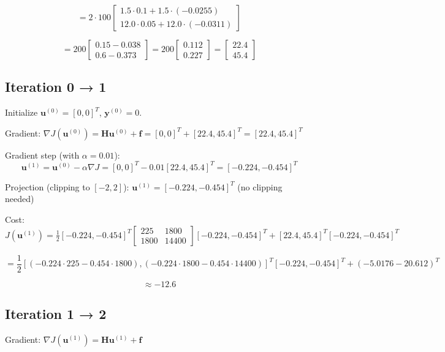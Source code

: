 \[
= 2 \cdot 100 \begin{bmatrix} 1.5 \cdot 0.1 + 1.5 \cdot (-0.0255) \\ 12.0 \cdot 0.05 + 12.0 \cdot (-0.0311) \end{bmatrix}
\]

\[
= 200 \begin{bmatrix} 0.15 - 0.038 \\ 0.6 - 0.373 \end{bmatrix} = 200 \begin{bmatrix} 0.112 \\ 0.227 \end{bmatrix} = \begin{bmatrix} 22.4 \\ 45.4 \end{bmatrix}
\]

\subsection{Iteration 0 → 1}

Initialize $\mathbf{u}^{(0)} = [0, 0]^T$, $\mathbf{y}^{(0)} = 0$.

Gradient: $\nabla J(\mathbf{u}^{(0)}) = \mathbf{H} \mathbf{u}^{(0)} + \mathbf{f} = [0, 0]^T + [22.4, 45.4]^T = [22.4, 45.4]^T$

Gradient step (with $\alpha = 0.01$):
\[
\mathbf{u}^{(1)} = \mathbf{u}^{(0)} - \alpha \nabla J = [0, 0]^T - 0.01 [22.4, 45.4]^T = [-0.224, -0.454]^T
\]

Projection (clipping to $[-2, 2]$): $\mathbf{u}^{(1)} = [-0.224, -0.454]^T$ (no clipping needed)

Cost: $J(\mathbf{u}^{(1)}) = \frac{1}{2} [-0.224, -0.454]^T \begin{bmatrix} 225 & 1800 \\ 1800 & 14400 \end{bmatrix} [-0.224, -0.454]^T + [22.4, 45.4]^T [-0.224, -0.454]^T$

\[
= \frac{1}{2} [(-0.224 \cdot 225 - 0.454 \cdot 1800), (-0.224 \cdot 1800 - 0.454 \cdot 14400)]^T [-0.224, -0.454]^T + (-5.0176 - 20.612)^T
\]

\[
\approx -12.6
\]

\subsection{Iteration 1 → 2}

Gradient: $\nabla J(\mathbf{u}^{(1)}) = \mathbf{H} \mathbf{u}^{(1)} + \mathbf{f}$

